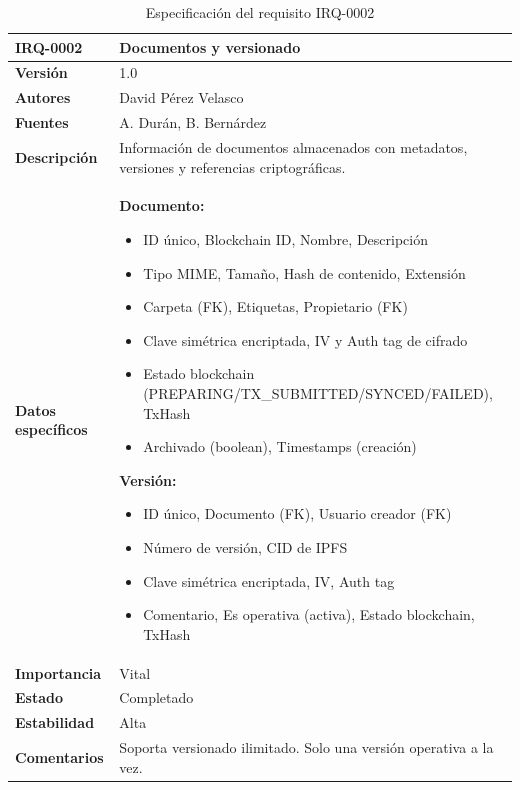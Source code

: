 \documentclass[11pt, a4paper]{article}
\begin{document}
\begin{table}[H]
    \centering
    \small
    \begin{tabular}{|p{4cm}|p{10cm}|}
    \hline
    \textbf{IRQ-0002} & Documentos y versionado \\
    \hline
    \textbf{Versión} & 1.0 \\
    \hline
    \textbf{Autores} & David Pérez Velasco \\
    \hline
    \textbf{Fuentes} & A. Durán, B. Bernárdez \\
    \hline
    \textbf{Descripción} & Información de documentos almacenados con metadatos, versiones y referencias criptográficas. \\
    \hline
    \textbf{Datos específicos} & 
    \textbf{Documento:}
    \begin{itemize}
        \item ID único, Blockchain ID, Nombre, Descripción
        \item Tipo MIME, Tamaño, Hash de contenido, Extensión
        \item Carpeta (FK), Etiquetas, Propietario (FK)
        \item Clave simétrica encriptada, IV y Auth tag de cifrado
        \item Estado blockchain (PREPARING/TX\_SUBMITTED/SYNCED/FAILED), TxHash
        \item Archivado (boolean), Timestamps (creación)
    \end{itemize}
    
    \textbf{Versión:}
    \begin{itemize}
        \item ID único, Documento (FK), Usuario creador (FK)
        \item Número de versión, CID de IPFS
        \item Clave simétrica encriptada, IV, Auth tag
        \item Comentario, Es operativa (activa), Estado blockchain, TxHash
    \end{itemize} \\
    \hline
    \textbf{Importancia} & Vital \\
    \hline
    \textbf{Estado} & Completado \\
    \hline
    \textbf{Estabilidad} & Alta \\
    \hline
    \textbf{Comentarios} & Soporta versionado ilimitado. Solo una versión operativa a la vez. \\
    \hline
    \end{tabular}
    \caption{Especificación del requisito IRQ-0002}
\end{table}
\end{document}
